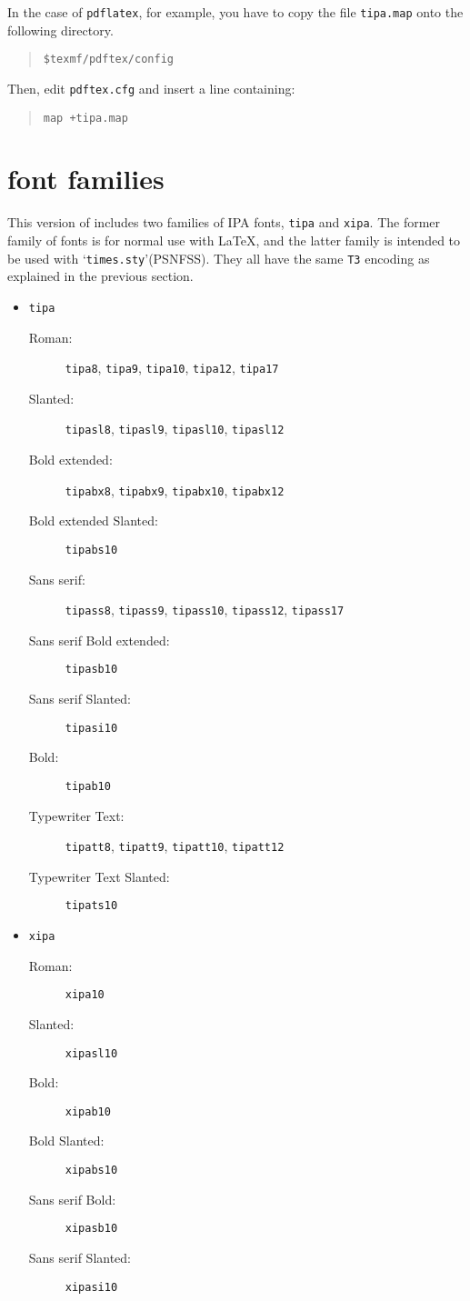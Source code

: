 In the case of \texttt{pdflatex}, for example, you have to copy the file
\texttt{tipa.map} onto the following directory.

\begin{quote}
  \verb|$texmf/pdftex/config|%
\end{quote}

Then, edit \texttt{pdftex.cfg} and insert a line containing:

\begin{quote}
  \texttt{map +tipa.map}
\end{quote}


\section{\tipa{} font families}

This version of \tipa{} includes two families of IPA fonts,
\texttt{tipa} and \texttt{xipa}. The former family of fonts is for
normal use with \LaTeX, and the latter family is intended to be used
with `\texttt{times.sty}'(PSNFSS). They all have the same \texttt{T3}
encoding as explained in the previous section.

\begin{itemize}
\item \texttt{tipa}
  \begin{description}
  \item[Roman:]
    \texttt{tipa8}, \texttt{tipa9}, \texttt{tipa10}, \texttt{tipa12},
    \texttt{tipa17}
  \item[Slanted:]
    \texttt{tipasl8}, \texttt{tipasl9}, \texttt{tipasl10},
    \texttt{tipasl12}
  \item[Bold extended:]
    \texttt{tipabx8}, \texttt{tipabx9},
    \texttt{tipabx10}, \texttt{tipabx12}
  \item[Bold extended Slanted:] \texttt{tipabs10}
  \item[Sans serif:]
    \texttt{tipass8}, \texttt{tipass9}, \texttt{tipass10},
    \texttt{tipass12}, \texttt{tipass17}
  \item[Sans serif Bold extended:] \texttt{tipasb10}
  \item[Sans serif Slanted:] \texttt{tipasi10}
  \item[Bold:] \texttt{tipab10}
  \item[Typewriter Text:]
    \texttt{tipatt8}, \texttt{tipatt9}, \texttt{tipatt10},
    \texttt{tipatt12}
  \item[Typewriter Text Slanted:] \texttt{tipats10}
  \end{description}
\item \texttt{xipa}
  \begin{description}
  \item[Roman:] \texttt{xipa10}
  \item[Slanted:] \texttt{xipasl10}
  \item[Bold:] \texttt{xipab10}
  \item[Bold Slanted:] \texttt{xipabs10}
  \item[Sans serif Bold:] \texttt{xipasb10}
  \item[Sans serif Slanted:] \texttt{xipasi10}
  \end{description}
\end{itemize}

